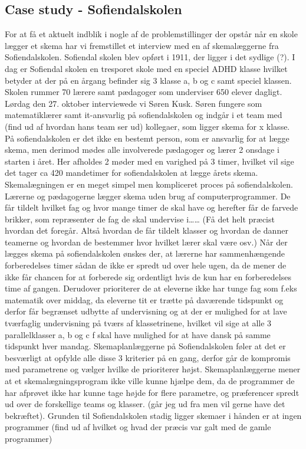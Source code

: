 \subsection{Case study - Sofiendalskolen}
For at få et aktuelt indblik i nogle af de problemstillinger der opstår når en skole lægger et skema har vi fremstillet et interview med en af skemalæggerne fra Sofiendalskolen.
Sofiendal skolen blev opført i 1911, der ligger i det sydlige (?). I dag er Sofiendal skolen en tresporet skole med en speciel ADHD klasse hvilket betyder at der på en årgang befinder sig 3 klasse a, b og c samt speciel klassen. Skolen rummer 70 lærere samt pædagoger som underviser 650 elever dagligt. 
Lørdag den 27. oktober interviewede vi Søren Kusk. Søren fungere som matematiklærer samt it-ansvarlig på sofiendalskolen og indgår i et team med (find ud af hvordan hans team ser ud) kollegaer, som ligger skema for x klasse. På sofiendalskolen er det ikke en bestemt person, som er ansvarlig for at lægge skema, men derimod mødes alle involverede pædagoger og lærer 2 onsdage i starten i året. Her afholdes 2 møder med en varighed på 3 timer, hvilket vil sige det tager ca 420 mandetimer for sofiendalskolen at lægge årets skema. Skemalægningen er en meget simpel men kompliceret proces på sofiendalskolen. Lærerne og pædagogerne lægger skema uden brug af computerprogrammer. De får tildelt hvilket fag og hvor mange timer de skal have og herefter får de farvede brikker, som repræsenter de fag de skal undervise i…… (Få det helt præcist hvordan det foregår. Altså hvordan de får tildelt klasser og hvordan de danner teamerne og hvordan de bestemmer hvor hvilket lærer skal være osv.)
Når der lægges skema på sofiendalskolen ønskes der, at lærerne har sammenhængende forberedelses timer sådan de ikke er spredt ud over hele ugen, da de mener de ikke får chancen for at forberede sig ordentligt hvis de kun har en forberedelses time af gangen. Derudover prioriterer de at eleverne ikke har tunge fag som f.eks matematik over middag, da eleverne tit er trætte på daværende tidspunkt og derfor får begrænset udbytte af undervisning og at der er mulighed for at lave tværfaglig undervisning på tværs af klassetrinene, hvilket vil sige at alle 3 parallelklasser a, b og c f skal have mulighed for at have dansk på samme tidspunkt hver mandag. Skemaplanlæggerne på Sofiendalskolen føler at det er besværligt at opfylde alle disse 3 kriterier på en gang, derfor går de kompromis med parametrene og vælger hvilke de prioriterer højst. Skemaplanlæggerne mener at et skemalægningsprogram ikke ville kunne hjælpe dem, da de programmer de har afprøvet ikke har kunne tage højde for flere parametre, og præferencer spredt ud over de forskellige teams og klasser. (går jeg ud fra men vil gerne have det bekræftet).
Grunden til Sofiendalskolen stadig ligger skemaer i hånden er at ingen programmer (find ud af hvilket og hvad der præcis var galt med de gamle programmer)
